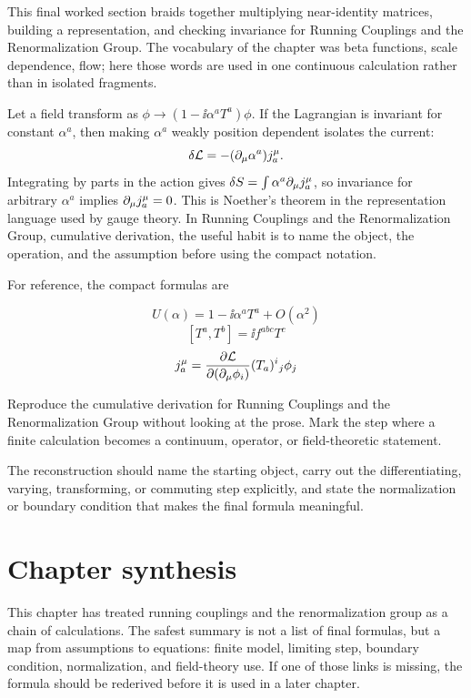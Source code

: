 This final worked section braids together multiplying near-identity matrices, building a representation, and checking invariance for Running Couplings and the Renormalization Group.  The vocabulary of the chapter was beta functions, scale dependence, flow; here those words are used in one continuous calculation rather than in isolated fragments.

Let a field transform as \(\phi\to (1-\ii\alpha^aT^a)\phi\).  If the Lagrangian is invariant for constant \(\alpha^a\), then making \(\alpha^a\) weakly position dependent isolates the current:
\[
  \delta\mathcal L=-(\partial_\mu\alpha^a)j^\mu_a.
\]
Integrating by parts in the action gives \(\delta S=\int\alpha^a\partial_\mu j^\mu_a\), so invariance for arbitrary \(\alpha^a\) implies \(\partial_\mu j^\mu_a=0\).  This is Noether's theorem in the representation language used by gauge theory.  In Running Couplings and the Renormalization Group, cumulative derivation, the useful habit is to name the object, the operation, and the assumption before using the compact notation.

For reference, the compact formulas are

\[
  U(\alpha)=1-\ii\alpha^aT^a+O(\alpha^2)
\]
\[
  [T^a,T^b]=\ii f^{abc}T^c
\]
\[
  j^\mu_a=\frac{\partial\mathcal L}{\partial(\partial_\mu\phi_i)}(T_a)^i{}_j\phi_j
\]

\begin{exercise}
Reproduce the cumulative derivation for Running Couplings and the Renormalization Group without looking at the prose.  Mark the step where a finite calculation becomes a continuum, operator, or field-theoretic statement.
\begin{answer}
The reconstruction should name the starting object, carry out the differentiating, varying, transforming, or commuting step explicitly, and state the normalization or boundary condition that makes the final formula meaningful.
\end{answer}
\end{exercise}



\section{Chapter synthesis}

This chapter has treated running couplings and the renormalization group as a chain of calculations.  The safest summary is not a list of final formulas, but a map from assumptions to equations: finite model, limiting step, boundary condition, normalization, and field-theory use.  If one of those links is missing, the formula should be rederived before it is used in a later chapter.

